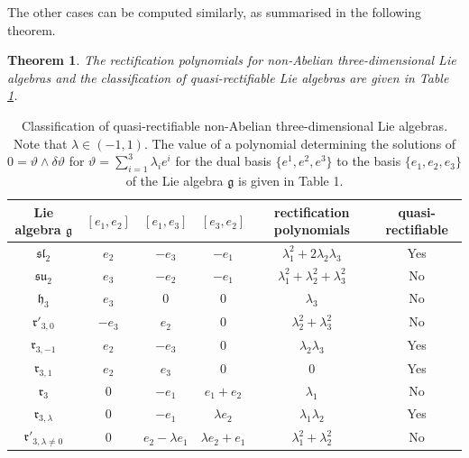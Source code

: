 \documentclass[12pt]{article}
\theoremstyle{plain}
\newtheorem{theorem}{Theorem}[section]
\theoremstyle{definition}
\numberwithin{equation}{section}
\begin{document}
 

The other cases can be computed similarly, as summarised in the following theorem.

\begin{theorem} The rectification polynomials for non-Abelian three-dimensional Lie algebras and the classification of quasi-rectifiable Lie algebras are given in Table  \ref{fig:Lie-algebra-classification}.
\end{theorem}
\begin{table}[ht]
    \centering
    \begin{tabular}{|c|c|c|c|c|c|}
        \hline
        Lie algebra $\mathfrak{g}$& $[e_1,e_2]$ & $[e_1,e_3]$ & $[e_3,e_2]$ & rectification polynomials& quasi-rectifiable \\
        \hline
        $\mathfrak{sl}_2$ & $e_2$ & $-e_3$ & $-e_1$ & $\lambda_1^2 + 2\lambda_2\lambda_3$ & Yes\\
        \hline
        $\mathfrak{su}_2$ & $e_3$ & $-e_2$ & $-e_1$ & $\lambda_1^2 + \lambda_2^2 + \lambda_3^2$& No \\
        \hline
        $\mathfrak{h}_3$ & $e_3$ & $0$ & $0$ & $\lambda_3$ & No \\
        \hline
        $\mathfrak{r}'_{3,0}$ & $-e_3$ & $e_2$ & $0$ & $\lambda_2^2 + \lambda_3^2 $& No \\
        \hline
        $\mathfrak{r}_{3,-1}$ & $e_2$ & $-e_3$ & $0$ & $\lambda_2\lambda_3$ & Yes\\
        \hline
        $\mathfrak{r}_{3,1}$ & $e_2$ & $e_3$ & $0$ & 0& Yes\\
        \hline
        $\mathfrak{r}_{3}$ & $0$ & $-e_1$ & $e_1 + e_2$ & $\lambda_1 $ & No\\
        \hline
        $\mathfrak{r}_{3,\lambda}$ & $0$ & $-e_1$ & $\lambda e_2$ & $ \lambda_1\lambda_2$ & Yes\\
        \hline
        $\mathfrak{r}'_{3,\lambda\neq 0}$ & $0$ & $e_2-\lambda e_1$ & $\lambda e_2 + e_1$ & $\lambda_1^2 + \lambda_2^2$ & No \\
        \hline
    \end{tabular}
    \caption{Classification of quasi-rectifiable non-Abelian three-dimensional Lie algebras. Note that $\lambda\in (-1,1).$ The value of a polynomial determining the solutions of $0=\vartheta\wedge \delta \vartheta$ for $\vartheta=\sum_{i=1}^3\lambda_ie^i$ for the dual basis $\{e^1,e^2,e^3\}$ to the basis $\{e_1,e_2,e_3\}$ of the Lie algebra $\mathfrak{g}$ is given in Table 1.}
    \label{fig:Lie-algebra-classification}
\end{table}
\end{document}
